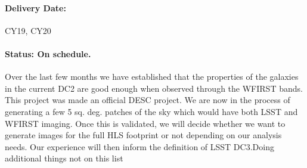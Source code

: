 \paragraph*{Delivery Date:} CY19, CY20

\paragraph*{Status: On schedule.} Over the last few months we have established that the properties of the galaxies in the current DC2 are good enough when observed through the WFIRST bands. This project was made an official DESC project. We are now in the process of generating a few 5 sq. deg. patches of the sky which would have both LSST and WFIRST imaging. Once this is validated, we will decide whether we want to generate images for the full HLS footprint or not depending on our analysis needs. Our experience will then inform the definition of LSST DC3.Doing additional things not on this list

